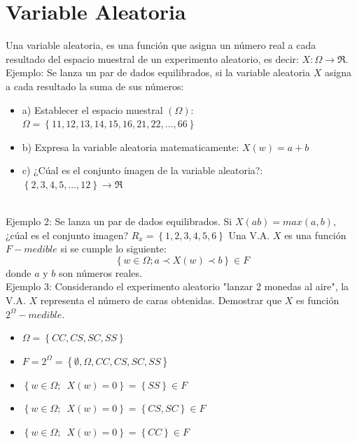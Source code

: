 \documentclass[11pt,fleqn]{book} %
\numberwithin{equation}{section} %
\numberwithin{figure}{section} %
\numberwithin{table}{section} %
\begin{document}
\section{Variable Aleatoria}
Una variable aleatoria, es una función que asigna un número real a cada resultado del espacio muestral de un experimento aleatorio, es decir: $X:\Omega \longrightarrow \Re$. 
\ \\%
Ejemplo: Se lanza un par de dados equilibrados, si la variable aleatoria $X$ asigna a cada resultado la suma de sus números:
\begin{itemize}
    \item a) Establecer el espacio muestral $(\Omega)$: $\Omega = \left\lbrace {11,12,13,14,15,16,21,22,...,66}\right\rbrace$
    \item b) Expresa la variable aleatoria matematicamente: $X(w)=a+b$
    \item c) ¿Cúal es el conjunto ímagen de la variable aleatoria?: $\left\lbrace {2,3,4,5,...,12}\right\rbrace \longrightarrow \Re$
\end{itemize}
\ \\%
Ejemplo 2: Se lanza un par de dados equilibrados. Si  $X(ab)=max(a,b)$, ¿cúal es el conjunto imagen? $R_{x}= \left\lbrace { 1, 2, 3, 4, 5, 6 }\right\rbrace$ 
Una V.A. $X$ es una función $F-medible$ si se cumple lo siguiente:
$$ \left\lbrace { w \in \Omega ; a \prec X(w) \prec b } \right\rbrace \in F$$ donde $a$ y $b$ son números reales.
\ \\%
Ejemplo 3: Considerando el experimento aleatorio "lanzar 2 monedas al aire", la V.A. $X$ representa el número de caras obtenidas. Demostrar que $X$ es función $2^\Omega -medible$.
\begin{itemize}
    \item ${ \Omega = \left\lbrace { CC, CS, SC, SS} \right\rbrace  }$
\end{itemize}
\begin{itemize}
    \item ${ F = 2^\Omega = \left\lbrace { \emptyset, \Omega, CC, CS, SC, SS} \right\rbrace  }$
\end{itemize}
\begin{itemize}
    \item ${ \left\lbrace { w \in \Omega; \enspace X(w) = 0 } \right\rbrace = \left\lbrace { SS } \right\rbrace \in F  }$
\end{itemize}
\begin{itemize}
    \item ${ \left\lbrace { w \in \Omega; \enspace X(w) = 0 } \right\rbrace = \left\lbrace { CS, SC } \right\rbrace \in F  }$
\end{itemize}
\begin{itemize}
    \item ${ \left\lbrace { w \in \Omega; \enspace X(w) = 0 } \right\rbrace = \left\lbrace { CC } \right\rbrace \in F  }$
\end{itemize}
\end{document}
